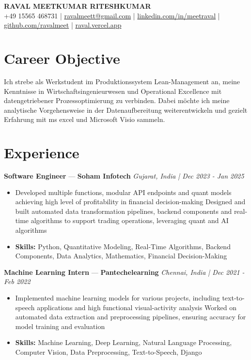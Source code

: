 \documentclass[a4paper,10pt]{article}
\begin{document}
\begin{center}
  {\Large\bfseries RAVAL MEETKUMAR RITESHKUMAR}\\[2pt]
  {\small +49 15565 468731 \;|\; \href{mailto:ravalmeett@gmail.com}{ravalmeett@gmail.com} \;|\; \href{https://www.linkedin.com/in/meetraval/}{linkedin.com/in/meetraval} \;|\; \href{https://github.com/ravalmeet}{github.com/ravalmeet} \;|\; \href{https://raval.vercel.app/}{raval.vercel.app}}
\end{center}
\vspace{-3pt}

\section*{Career Objective}
Ich strebe als Werkstudent im Produktionssystem Lean-Management an, meine Kenntnisse in Wirtschaftsingenieurwesen und Operational Excellence mit datengetriebener Prozessoptimierung zu verbinden. Dabei möchte ich meine analytische Vorgehensweise in der Datenaufbereitung weiterentwickeln und gezielt Erfahrung mit ms excel und Microsoft Visio sammeln.\par

\section*{Experience}
\textbf{Software Engineer} — \textbf{Soham Infotech} \hfill \textit{Gujarat, India \;|\; Dec 2023 - Jan 2025}\par
\vspace{1pt}
\begin{itemize}
  \item Developed multiple functions, modular API endpoints and quant models achieving high level of profitability in financial decision-making Designed and built automated data transformation pipelines, backend components and real-time algorithms to support trading operations, leveraging quant and AI algorithms
  \item \textbf{Skills:} Python, Quantitative Modeling, Real-Time Algorithms, Backend Components, Data Analytics, Mathematics, Financial Decision-Making
\end{itemize}
\vspace{3pt}
\textbf{Machine Learning Intern} — \textbf{Pantechelearning} \hfill \textit{Chennai, India \;|\; Dec 2021 - Feb 2022}\par
\vspace{1pt}
\begin{itemize}
  \item Implemented machine learning models for various projects, including text-to-speech applications and high functional visual-activity analysis Worked on automated data extraction and preprocessing pipelines, ensuring accuracy for model training and evaluation
  \item \textbf{Skills:} Machine Learning, Deep Learning, Natural Language Processing, Computer Vision, Data Preprocessing, Text-to-Speech, Django
\end{itemize}
\end{document}

